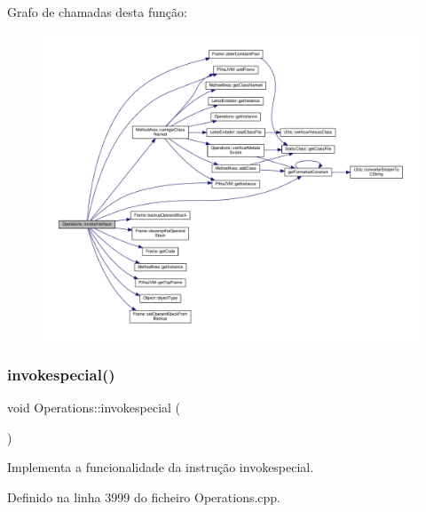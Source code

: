 Grafo de chamadas desta função\+:\nopagebreak
\begin{figure}[H]
\begin{center}
\leavevmode
\includegraphics[width=350pt]{classOperations_a9206595fad5d3ac24514b2dfd6a013da_cgraph}
\end{center}
\end{figure}
\mbox{\label{classOperations_ab561e27c8450ceec7e4f8b0a155fcda3}} 
\subsubsection{\texorpdfstring{invokespecial()}{invokespecial()}}
{\footnotesize\ttfamily void Operations\+::invokespecial (\begin{DoxyParamCaption}{ }\end{DoxyParamCaption})\hspace{0.3cm}{\ttfamily [private]}}



Implementa a funcionalidade da instrução invokespecial. 



Definido na linha 3999 do ficheiro Operations.\+cpp.



